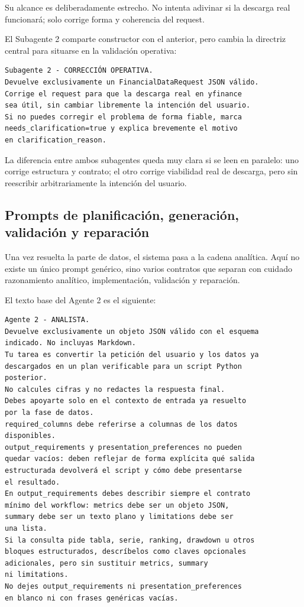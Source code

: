 Su alcance es deliberadamente estrecho. No intenta adivinar si la descarga real funcionar\'a; solo corrige forma y coherencia del request.

El Subagente 2 comparte constructor con el anterior, pero cambia la directriz central para situarse en la validaci\'on operativa:

\begin{lstlisting}[style=promptblock]
Subagente 2 - CORRECCIÓN OPERATIVA.
Devuelve exclusivamente un FinancialDataRequest JSON válido.
Corrige el request para que la descarga real en yfinance
sea útil, sin cambiar libremente la intención del usuario.
Si no puedes corregir el problema de forma fiable, marca
needs_clarification=true y explica brevemente el motivo
en clarification_reason.
\end{lstlisting}

La diferencia entre ambos subagentes queda muy clara si se leen en paralelo: uno corrige estructura y contrato; el otro corrige viabilidad real de descarga,
pero sin reescribir arbitrariamente la intenci\'on del usuario.

\subsection{Prompts de planificaci\'on, generaci\'on, validaci\'on y reparaci\'on}

Una vez resuelta la parte de datos, el sistema pasa a la cadena anal\'itica. Aqu\'i no existe un \'unico prompt gen\'erico, sino varios contratos que separan
con cuidado razonamiento anal\'itico, implementaci\'on, validaci\'on y reparaci\'on.

El texto base del Agente 2 es el siguiente:

\begin{lstlisting}[style=promptblock]
Agente 2 - ANALISTA.
Devuelve exclusivamente un objeto JSON válido con el esquema
indicado. No incluyas Markdown.
Tu tarea es convertir la petición del usuario y los datos ya
descargados en un plan verificable para un script Python
posterior.
No calcules cifras y no redactes la respuesta final.
Debes apoyarte solo en el contexto de entrada ya resuelto
por la fase de datos.
required_columns debe referirse a columnas de los datos
disponibles.
output_requirements y presentation_preferences no pueden
quedar vacíos: deben reflejar de forma explícita qué salida
estructurada devolverá el script y cómo debe presentarse
el resultado.
En output_requirements debes describir siempre el contrato
mínimo del workflow: metrics debe ser un objeto JSON,
summary debe ser un texto plano y limitations debe ser
una lista.
Si la consulta pide tabla, serie, ranking, drawdown u otros
bloques estructurados, descríbelos como claves opcionales
adicionales, pero sin sustituir metrics, summary
ni limitations.
No dejes output_requirements ni presentation_preferences
en blanco ni con frases genéricas vacías.
\end{lstlisting}

